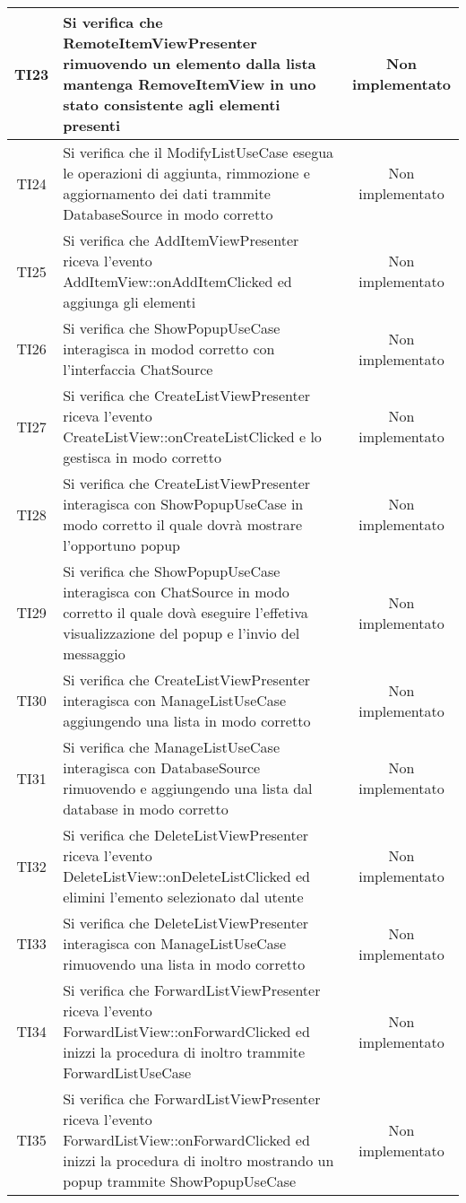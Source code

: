 \begin{center}
\begin{longtable}{|c|>{\centering}m{10cm}|c|}
		TI23 & Si verifica che RemoteItemViewPresenter rimuovendo un elemento dalla lista mantenga RemoveItemView in uno stato consistente agli elementi presenti & Non implementato \\ \hline
		TI24 & Si verifica che il ModifyListUseCase esegua le operazioni di aggiunta, rimmozione e aggiornamento dei dati trammite DatabaseSource in modo corretto & Non implementato \\ \hline
		TI25 & Si verifica che AddItemViewPresenter riceva l'evento AddItemView::onAddItemClicked ed aggiunga gli elementi & Non implementato \\ \hline
		TI26 & Si verifica che ShowPopupUseCase interagisca in modod corretto con l'interfaccia ChatSource & Non implementato \\ \hline
		TI27 & Si verifica che CreateListViewPresenter riceva l'evento CreateListView::onCreateListClicked e lo gestisca in modo corretto & Non implementato \\ \hline
		TI28 & Si verifica che CreateListViewPresenter interagisca con ShowPopupUseCase in modo corretto il quale dovrà mostrare l'opportuno popup & Non implementato \\ \hline
		TI29 & Si verifica che ShowPopupUseCase interagisca con ChatSource in modo corretto il quale dovà eseguire l'effetiva visualizzazione del popup e l'invio del messaggio & Non implementato \\ \hline
		TI30 & Si verifica che CreateListViewPresenter interagisca con ManageListUseCase aggiungendo una lista in modo corretto & Non implementato \\ \hline
		TI31 & Si verifica che ManageListUseCase interagisca con DatabaseSource rimuovendo e aggiungendo una lista dal database in modo corretto & Non implementato \\ \hline
		TI32 & Si verifica che DeleteListViewPresenter riceva l'evento DeleteListView::onDeleteListClicked ed elimini l'emento selezionato dal utente & Non implementato \\ \hline
		TI33 & Si verifica che DeleteListViewPresenter interagisca con ManageListUseCase rimuovendo una lista in modo corretto & Non implementato \\ \hline
		TI34 & Si verifica che ForwardListViewPresenter riceva l'evento ForwardListView::onForwardClicked ed inizzi la procedura di inoltro trammite ForwardListUseCase & Non implementato \\ \hline
		TI35 & Si verifica che ForwardListViewPresenter riceva l'evento ForwardListView::onForwardClicked ed inizzi la procedura di inoltro mostrando un popup trammite ShowPopupUseCase & Non implementato \\ \hline

\end{longtable}
\end{center}
